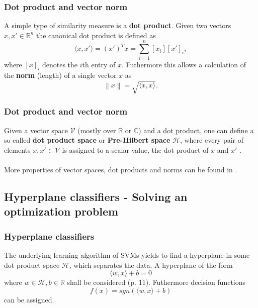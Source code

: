\documentclass{beamer}
\begin{document}
\begin{frame}{}
    \frametitle{Dot product and vector norm}
    A simple type of similarity measure is a \textbf{dot product}. Given two vectors $x, x' \in \mathbb{R}^n$ the canonical dot product is defined as
    \begin{equation}
        \langle x,x' \rangle = (x')^T x = \sum_{i = 1}^{n} [x_i] [x']_i,
    \end{equation}
    where $\left[x\right]_i$ denotes the $i$th entry of $x$. Futhermore this allows a calculation of the \textbf{norm} (length) of a single vector $x$ as 
    \begin{equation}
        \left\lVert x \right\rVert = \sqrt{\langle x,x \rangle}.
    \end{equation}
\end{frame}


\begin{frame}{}
    \frametitle{Dot product and vector norm}
    Given a vector space $\mathcal{V}$ (mostly over $\mathbb{R}$ or $\mathbb{C}$) and a dot product, one can define a so called \textbf{dot product space} or \textbf{Pre-Hilbert space} $\mathcal{H}$, where every pair of elements $x, x' \in \mathcal{V}$ is assigned to a scalar value, the dot product of $x$ and $x'$ \cite{Bronstein}. \\~\\

    More properties of vector spaces, dot products and norms can be found in \cite{Liesen}.
\end{frame}


\subsection{Hyperplane classifiers - Solving an optimization problem}

\begin{frame}{}
    \frametitle{Hyperplane classifiers}
    The underlying learning algorithm of SVMs yields to find a hyperplane in some dot product space $\mathcal{H}$, which separates the data. A hyperplane of the form
    \begin{equation}
        \langle w,x \rangle + b = 0
    \end{equation}
    where $w \in \mathcal{H}, b \in \mathbb{R}$ shall be considered \cite{Schoelkopf}(p. 11). Futhermore decision functions 
    \begin{equation}
        f(x) = sgn \left( \langle w,x \rangle + b \right)
    \end{equation}
    can be assigned.
\end{frame}
\end{document}
